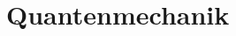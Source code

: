 \renewcommand{\lastmod}{10. September 2025}
\renewcommand{\chapterauthors}{Markus Lippitz}

\chapter{Quantenmechanik}








